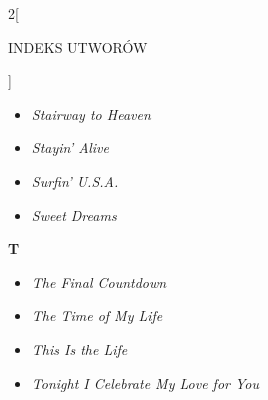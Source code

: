 \documentclass[a4paper]{report}
\begin{document}
\begin{multicols*}{2}[\begin{Huge}INDEKS UTWORÓW\end{Huge}\vspace{1cm}]
\begin{minipage}{\columnwidth}
\begin{itemize}[topsep=6pt, after=\vspace{1.5mm}, leftmargin=0mm]
		\itemsep0em
		\item[]  \textit{Stairway to Heaven}  \\
	\end{itemize}
\end{minipage}
\begin{minipage}{\columnwidth}
	\begin{itemize}[topsep=6pt, after=\vspace{1.5mm}, leftmargin=0mm]
		\itemsep0em
		\item[]  \textit{Stayin' Alive}  \\
	\end{itemize}
\end{minipage}
\begin{minipage}{\columnwidth}
	\begin{itemize}[topsep=6pt, after=\vspace{5mm}, leftmargin=0mm]
		\itemsep0em
		\item[]  \textit{Surfin' U.S.A.}  \\
		\item[]  \textit{Sweet Dreams}  \\
	\end{itemize}
\end{minipage}
\begin{minipage}{\columnwidth}
\begin{Large}
		\textbf{T}
	\end{Large} 
	\begin{itemize}[topsep=6pt, after=\vspace{1.5mm}, leftmargin=0mm]
		\itemsep0em
		\item[]\textit{The Final Countdown}  \\
		\item[]  \textit{The Time of My Life}  \\
	\end{itemize}
\end{minipage}
\begin{minipage}{\columnwidth}
	\begin{itemize}[topsep=6pt, after=\vspace{5mm}, leftmargin=0mm]
		\itemsep0em
		\item[]  \textit{This Is the Life}  \\
		\item[]  \textit{Tonight I Celebrate My Love for You}  \\
	\end{itemize}

\end{minipage}
\end{multicols*}
\end{document}
